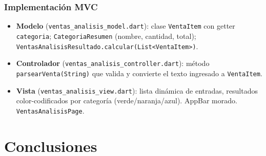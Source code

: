 \documentclass[12pt,a4paper]{article}
\begin{document}
\subsubsection{Implementación MVC}

\begin{itemize}
  \item \textbf{Modelo} (\texttt{ventas\_analisis\_model.dart}): clase \texttt{VentaItem} con getter \texttt{categoria};\allowbreak{} \texttt{Categoria\allowbreak{}Resumen} (nombre, cantidad, total);\allowbreak{} \texttt{VentasAnalisis\allowbreak{}Resultado\allowbreak.calcular\allowbreak(List<\allowbreak{}VentaItem>)}.
  \item \textbf{Controlador} (\texttt{ventas\_analisis\_\allowbreak{}controller.dart}): método \texttt{parsearVenta\allowbreak(String)} que valida y convierte el texto ingresado a \texttt{VentaItem}.
  \item \textbf{Vista} (\texttt{ventas\_analisis\_\allowbreak{}view.dart}): lista dinámica de entradas, resultados color-codi\-ficados por categoría (verde/naranja/azul). AppBar morado. \texttt{VentasAnalisisPage}.
\end{itemize}

\section{Conclusiones}
\end{document}

